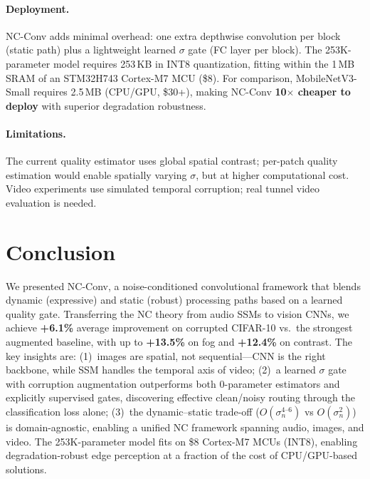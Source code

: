 \documentclass[10pt,twocolumn,letterpaper]{article}
\begin{document}
\paragraph{Deployment.}
NC-Conv adds minimal overhead: one extra depthwise convolution per block (static path) plus a lightweight learned $\sigma$ gate (FC layer per block).
The 253K-parameter model requires 253\,KB in INT8 quantization, fitting within the 1\,MB SRAM of an STM32H743 Cortex-M7 MCU (\$8).
For comparison, MobileNetV3-Small requires 2.5\,MB (CPU/GPU, \$30+), making NC-Conv \textbf{10$\times$ cheaper to deploy} with superior degradation robustness.

\paragraph{Limitations.}
The current quality estimator uses global spatial contrast; per-patch quality estimation would enable spatially varying $\sigma$, but at higher computational cost.
Video experiments use simulated temporal corruption; real tunnel video evaluation is needed.

\section{Conclusion}

We presented NC-Conv, a noise-conditioned convolutional framework that blends dynamic (expressive) and static (robust) processing paths based on a learned quality gate.
Transferring the NC theory from audio SSMs to vision CNNs, we achieve \textbf{+6.1\%} average improvement on corrupted CIFAR-10 vs.\ the strongest augmented baseline, with up to \textbf{+13.5\%} on fog and \textbf{+12.4\%} on contrast.
The key insights are: (1)~images are spatial, not sequential---CNN is the right backbone, while SSM handles the temporal axis of video; (2)~a learned $\sigma$ gate with corruption augmentation outperforms both 0-parameter estimators and explicitly supervised gates, discovering effective clean/noisy routing through the classification loss alone; (3)~the dynamic--static trade-off ($O(\sigma_n^{4\text{--}6})$ vs $O(\sigma_n^2)$) is domain-agnostic, enabling a unified NC framework spanning audio, images, and video.
The 253K-parameter model fits on \$8 Cortex-M7 MCUs (INT8), enabling degradation-robust edge perception at a fraction of the cost of CPU/GPU-based solutions.


{\small


}
\end{document}
